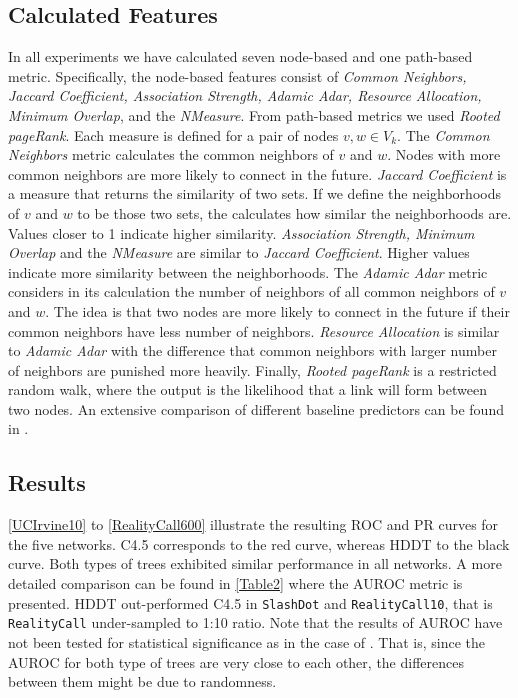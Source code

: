 \documentclass{acm_proc_article-sp}
\begin{document}
\subsection{Calculated Features}
In all experiments we have calculated seven node-based and one path-based metric. Specifically, the node-based features consist of \textit{Common Neighbors, Jaccard Coefficient, Association Strength, Adamic Adar, Resource Allocation, Minimum Overlap}, and the \textit{NMeasure}. From path-based metrics we used \textit{Rooted pageRank}. Each measure is defined for a pair of nodes ${v,w} \in V_k$. The \textit{Common Neighbors} metric calculates the common neighbors of $v$ and $w$. Nodes with more common neighbors are more likely to connect in the future. \textit{Jaccard Coefficient} is a measure that returns the similarity of two sets. If we define the neighborhoods of $v$ and $w$ to be those two sets, the  calculates how similar the neighborhoods are. Values closer to 1 indicate higher similarity. \textit{Association Strength, Minimum Overlap} and the \textit{NMeasure} are similar to \textit{Jaccard Coefficient}. Higher values indicate more similarity between the neighborhoods. The \textit{Adamic Adar} metric considers in its calculation the number of neighbors of all common neighbors of $v$ and $w$. The idea is that two nodes are more likely to connect in the future if their common neighbors have less number of neighbors. \textit{Resource Allocation} is similar to \textit{Adamic Adar} with the difference that common neighbors with larger number of neighbors are punished more heavily. Finally, \textit{Rooted pageRank} is a restricted random walk, where the output is the likelihood that a link will form between two nodes. An extensive comparison of different baseline predictors can be found in \cite{Liben-Nowell:2003:LPP:956863.956972}.

\subsection{Results}

\autoref{UCIrvine10} to \autoref{RealityCall600} illustrate the resulting ROC and PR curves for the five networks. C4.5 corresponds to the red curve, whereas HDDT to the black curve. Both types of trees exhibited similar performance in all networks. A more detailed comparison can be found in \autoref{Table2} where the AUROC metric is presented. HDDT out-performed C4.5 in \texttt{SlashDot} and \texttt{RealityCall10}, that is \texttt{RealityCall} under-sampled to 1:10 ratio. Note that the results of AUROC have not been tested for statistical significance as in the case of \cite{Cieslak2012}. That is, since the AUROC for both type of trees are very close to each other, the differences between them might be due to randomness.
\end{document}

